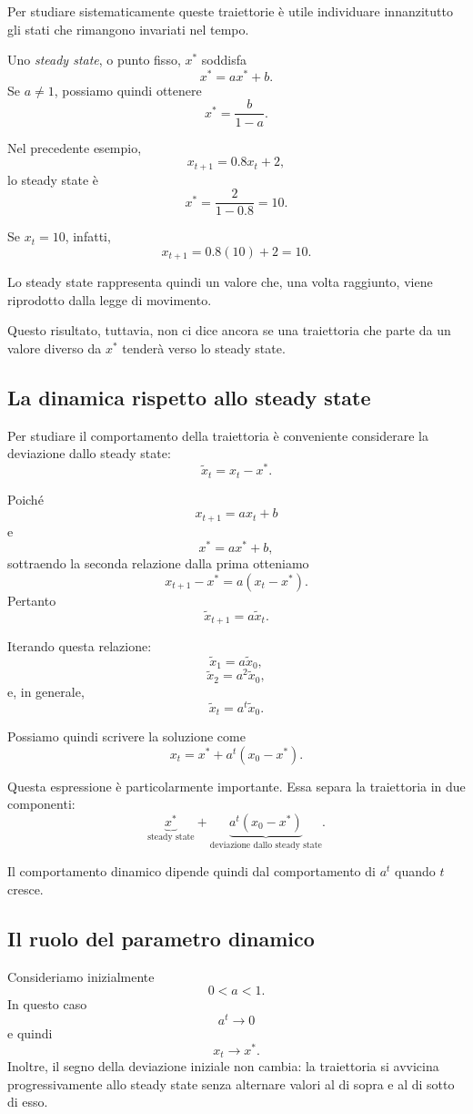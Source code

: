 \documentclass{book}
\begin{document}
Per studiare sistematicamente queste traiettorie è utile individuare
innanzitutto gli stati che rimangono invariati nel tempo.

Uno \emph{steady state}, o punto fisso, $x^*$ soddisfa
\[
x^*=a x^*+b.
\]
Se $a\neq 1$, possiamo quindi ottenere
\[
x^*=\frac{b}{1-a}.
\]

Nel precedente esempio,
\[
x_{t+1}=0.8x_t+2,
\]
lo steady state è
\[
x^*=\frac{2}{1-0.8}=10.
\]

Se $x_t=10$, infatti,
\[
x_{t+1}=0.8(10)+2=10.
\]

Lo steady state rappresenta quindi un valore che, una volta raggiunto,
viene riprodotto dalla legge di movimento.

Questo risultato, tuttavia, non ci dice ancora se una traiettoria che
parte da un valore diverso da $x^*$ tenderà verso lo steady state.


\subsection{La dinamica rispetto allo steady state}

Per studiare il comportamento della traiettoria è conveniente
considerare la deviazione dallo steady state:
\[
\widetilde{x}_t=x_t-x^*.
\]

Poiché
\[
x_{t+1}=a x_t+b
\]
e
\[
x^*=a x^*+b,
\]
sottraendo la seconda relazione dalla prima otteniamo
\[
x_{t+1}-x^*=a(x_t-x^*).
\]
Pertanto
\[
\widetilde{x}_{t+1}=a\widetilde{x}_t.
\]

Iterando questa relazione:
\[
\widetilde{x}_1=a\widetilde{x}_0,
\]
\[
\widetilde{x}_2=a^2\widetilde{x}_0,
\]
e, in generale,
\[
\widetilde{x}_t=a^t\widetilde{x}_0.
\]

Possiamo quindi scrivere la soluzione come
\[
x_t=x^*+a^t(x_0-x^*).
\]

Questa espressione è particolarmente importante. Essa separa la
traiettoria in due componenti:
\[
\underbrace{x^*}_{\text{steady state}}
+
\underbrace{a^t(x_0-x^*)}_{\text{deviazione dallo steady state}}.
\]

Il comportamento dinamico dipende quindi dal comportamento di $a^t$
quando $t$ cresce.


\subsection{Il ruolo del parametro dinamico}

Consideriamo inizialmente
\[
0<a<1.
\]
In questo caso
\[
a^t\rightarrow0
\]
e quindi
\[
x_t\rightarrow x^*.
\]
Inoltre, il segno della deviazione iniziale non cambia: la traiettoria
si avvicina progressivamente allo steady state senza alternare valori
al di sopra e al di sotto di esso.
\end{document}
